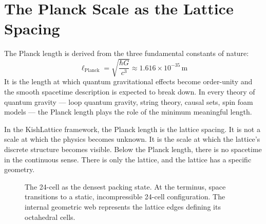 \documentclass[11pt, letterpaper, openany]{book}
\begin{document}
\section{The Planck Scale as the Lattice Spacing}

The Planck length is derived from the three fundamental constants of nature:
\[
\ell_\text{Planck} = \sqrt{\frac{\hbar G}{c^3}} \approx 1.616 \times 10^{-35}\,\text{m}
\]
It is the length at which quantum gravitational effects become order-unity
and the smooth spacetime description is expected to break down. In every
theory of quantum gravity --- loop quantum gravity, string theory, causal
sets, spin foam models --- the Planck length plays the role of the minimum
meaningful length.

In the KishLattice framework, the Planck length is the lattice spacing.
It is not a scale at which the physics becomes unknown. It is the scale
at which the lattice's discrete structure becomes visible. Below the
Planck length, there is no spacetime in the continuous sense. There is
only the lattice, and the lattice has a specific geometry.

\begin{figure}[H]
\centering
{}
\caption{The 24-cell as the densest packing state. At the terminus, space transitions to a static, incompressible 24-cell configuration. The internal geometric web represents the lattice edges defining its octahedral cells.}
\end{figure}
\end{document}
